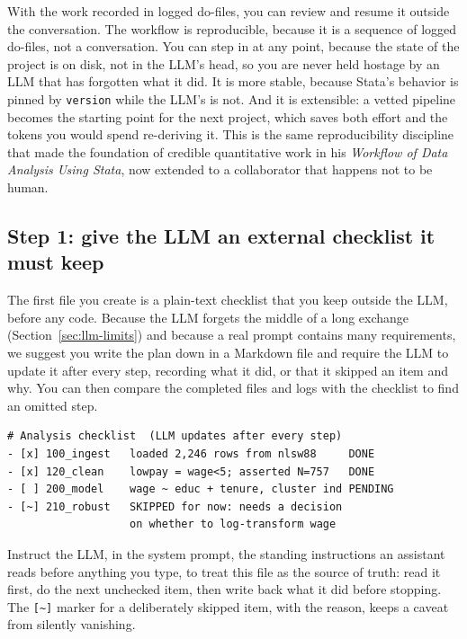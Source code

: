 With the work recorded in logged do-files, you can review and resume it outside the conversation. The workflow is reproducible, because it is a sequence of logged do-files, not a conversation. You can step in at any point, because the state of the project is on disk, not in the LLM's head, so you are never held hostage by an LLM that has forgotten what it did. It is more stable, because Stata's behavior is pinned by \texttt{version} while the LLM's is not. And it is extensible: a vetted pipeline becomes the starting point for the next project, which saves both effort and the tokens you would spend re-deriving it. This is the same reproducibility discipline that \textcite{long2009workflow} made the foundation of credible quantitative work in his \emph{Workflow of Data Analysis Using Stata}, now extended to a collaborator that happens not to be human.

\subsection{Step 1: give the LLM an external checklist it must keep}
The first file you create is a plain-text checklist that you keep outside the LLM, before any code. Because the LLM forgets the middle of a long exchange (Section~\ref{sec:llm-limits}) and because a real prompt contains many requirements, we suggest you write the plan down in a Markdown file and require the LLM to update it after every step, recording what it did, or that it skipped an item and why. You can then compare the completed files and logs with the checklist to find an omitted step.

\begin{kaobox}[frametitle=The checklist the LLM maintains: \texttt{TODO.md}]
\par
{\footnotesize
\begin{verbatim}
# Analysis checklist  (LLM updates after every step)
- [x] 100_ingest   loaded 2,246 rows from nlsw88     DONE
- [x] 120_clean    lowpay = wage<5; asserted N=757   DONE
- [ ] 200_model    wage ~ educ + tenure, cluster ind PENDING
- [~] 210_robust   SKIPPED for now: needs a decision
                   on whether to log-transform wage
\end{verbatim}
}
Instruct the LLM, in the system prompt, the standing instructions an assistant reads before anything you type, to treat this file as the source of truth: read it first, do the next unchecked item, then write back what it did before stopping. The \texttt{[\textasciitilde]} marker for a deliberately skipped item, with the reason, keeps a caveat from silently vanishing.
\end{kaobox}

